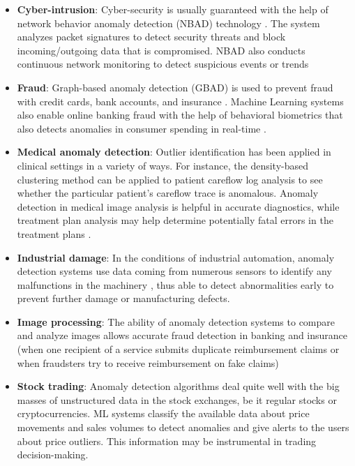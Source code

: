 \begin{itemize}
    \item \textbf{Cyber-intrusion}: Cyber-security is usually guaranteed with the help of network
        behavior anomaly detection (NBAD) technology \cite{ae_examples_nbda}. The system analyzes packet signatures to detect security threats and block incoming/outgoing data that is compromised. NBAD also conducts continuous network monitoring to detect suspicious events or trends
    \item \textbf{Fraud}: Graph-based anomaly detection (GBAD) is used to prevent fraud with
        credit cards, bank accounts, and insurance \cite{ae_examples_fraud}. Machine Learning systems also enable online banking fraud with the help of behavioral biometrics that also detects anomalies in consumer spending in real-time \cite{ae_examples_behaviour}.
    \item \textbf{Medical anomaly detection}: Outlier identification has been applied in clinical
        settings in a variety of ways. For instance, the density-based clustering method can be applied to patient careflow log analysis \cite{ae_examples_patient_careflow} to see whether the particular patient's careflow trace is anomalous. Anomaly detection in medical image analysis is helpful in accurate diagnostics, while treatment plan analysis may help determine potentially fatal errors in the treatment plans \cite{ae_examples_treatment}.
    \item \textbf{Industrial damage}: In the conditions of industrial automation, anomaly
        detection systems use data coming from numerous sensors to identify any malfunctions in the machinery \cite{ae_examples_machine_failure} \cite{ae_examples_acoustic_failure}, thus able to detect abnormalities early to prevent further damage or manufacturing defects.
    \item \textbf{Image processing}: The ability of anomaly detection systems to compare and
        analyze images allows accurate fraud detection in banking and insurance (when one recipient of a service submits duplicate reimbursement claims or when fraudsters try to receive reimbursement on fake claims)
    \item \textbf{Stock trading}: Anomaly detection algorithms deal quite well with the big masses
        of unstructured data in the stock exchanges, be it regular stocks or cryptocurrencies. ML systems classify the available data about price movements and sales volumes to detect anomalies and give alerts to the users about price outliers. This information may be instrumental in trading decision-making.
\end{itemize}

